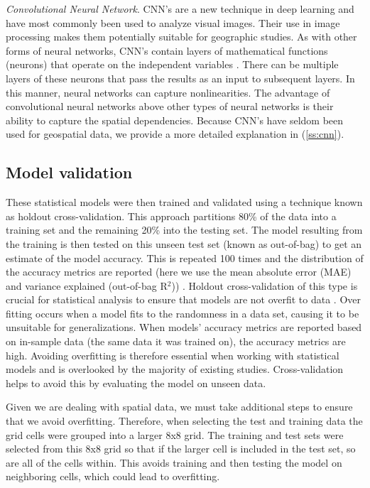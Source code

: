 \documentclass[final,3p,times,onecolumn,sort&compress]{elsarticle}
\begin{document}
\textit{Convolutional Neural Network}. 
CNN's are a new technique in deep learning and have most commonly been used to analyze visual images.
Their use in image processing makes them potentially suitable for geographic studies.
As with other forms of neural networks, CNN's contain layers of mathematical functions (neurons) that operate on the independent variables \citep{Geron2017-ek}.
There can be multiple layers of these neurons that pass the results as an input to subsequent layers.
In this manner, neural networks can capture nonlinearities.
The advantage of convolutional neural networks above other types of neural networks is their ability to capture the spatial dependencies. 
Because CNN's have seldom been used for geospatial data, we provide a more detailed explanation in (\ref{ss:cnn}).

\subsection{Model validation}
These statistical models were then trained and validated using a technique known as holdout cross-validation.
This approach partitions 80\% of the data into a training set and the remaining 20\% into the testing set.
The model resulting from the training is then tested on this unseen test set (known as out-of-bag) to get an estimate of the model accuracy.
This is repeated 100 times and the distribution of the accuracy metrics are reported (here we use the mean absolute error (MAE) and variance explained (out-of-bag R$^2$)) \citep{Shmueli2011-wd}.
Holdout cross-validation of this type is crucial for statistical analysis to ensure that models are not overfit to data \citep{Geron2017-ek}.
Over fitting occurs when a model fits to the randomness in a data set, causing it to be unsuitable for generalizations. 
When models' accuracy metrics are reported based on in-sample data (the same data it was trained on), the accuracy metrics are high.
Avoiding overfitting is therefore essential when working with statistical models and is overlooked by the majority of existing studies.
Cross-validation helps to avoid this by evaluating the model on unseen data.

Given we are dealing with spatial data, we must take additional steps to ensure that we avoid overfitting.
Therefore, when selecting the test and training data the grid cells were grouped into a larger 8x8 grid.
The training and test sets were selected from this 8x8 grid so that if the larger cell is included in the test set, so are all of the cells within.
This avoids training and then testing the model on neighboring cells, which could lead to overfitting.
\end{document}
